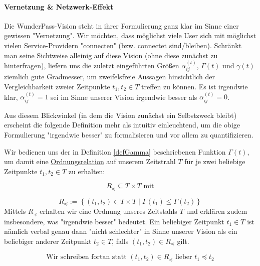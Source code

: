\paragraph{Vernetzung \& Netzwerk-Effekt}
\label{sec:zahlen_status_quo_netzwerk_effekt}

\textrm{ }
\vspace{0.3cm}

Die WunderPass-Vision steht in ihrer Formulierung ganz klar im Sinne einer gewissen "Vernetzung". Wir möchten, dass möglichst viele User sich mit möglichst vielen Service-Providern "connecten" (bzw. connectet sind/bleiben). Schränkt man seine Sichtweise alleinig auf diese Vision (ohne diese zunächst zu hinterfragen), liefern uns die zuletzt eingeführten Größen $\alpha^{(t)}_{ij}$, $\Gamma(t)$ und $\gamma(t)$ ziemlich gute Gradmesser, um zweifelsfreie Aussagen hinsichtlich der Vergleichbarkeit zweier Zeitpunkte $t_1, t_2 \in T$ treffen zu können. Es ist irgendwie klar, $\alpha^{(t)}_{ij} = 1$ sei im Sinne unserer Vision irgendwie besser als $\alpha^{(t)}_{ij} = 0$.

Aus diesem Blickwinkel (in dem die Vision zunächst ein Selbstzweck bleibt) erscheint die folgende Definition mehr als intuitiv einleuchtend, um die obige Formulierung "irgendwie besser" zu formalisieren und vor allem zu quantifizieren. 

\vspace{0.3cm}

\begin{Def}\label{defRelation}

Wir bedienen uns der in Definition \ref{defGamma} beschriebenen Funktion $\Gamma(t)$, um damit eine \href{https://de.wikipedia.org/wiki/Ordnungsrelation}{Ordnungsrelation} 
auf unserem Zeitstrahl $T$ für je zwei beliebige Zeitpunkte $t_1, t_2 \in T$ zu erhalten: 

\vspace{0.3cm}

\begin{equation*}
  R_{\preceq} \subseteq T \times T \textrm{ mit}
\end{equation*}

\begin{equation*}
  R_{\preceq}:= \left\{ (t_1, t_2) \in T \times T \mid \Gamma(t_1) \leq \Gamma(t_2) \right\}
\end{equation*}
\vspace{1cm}
Mittels $R_{\preceq}$ erhalten wir eine Ordnung unseres Zeitstahls $T$ und erklären zudem insbesondere, was "irgendwie besser" bedeutet. Ein beliebiger Zeitpunkt $t_1 \in T$ ist nämlich verbal genau dann "nicht schlechter" in Sinne unserer Vision als ein beliebiger anderer Zeitpunkt $t_2 \in T$, falls $(t_1, t_2) \in R_{\preceq}$ gilt.

\vspace{0.3cm}

\begin{equation*}
  \textrm{Wir schreiben fortan statt } (t_1, t_2) \in R_{\preceq} \textrm{ lieber } t_1 \preceq t_2 
\end{equation*}

\end{Def}

